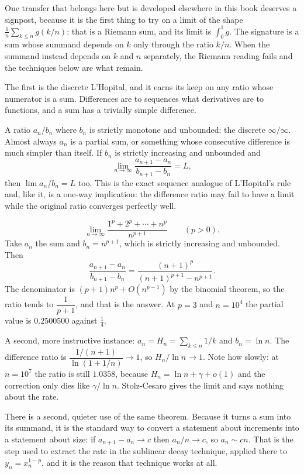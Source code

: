 One transfer that belongs here but is developed elsewhere in this book deserves a signpost, because it is the first thing to try on a limit of the shape $\tfrac1n\sum_{k\le n}g(k/n)$: that is a Riemann sum, and its limit is $\int_0^1g$. The signature is a sum whose summand depends on $k$ only through the ratio $k/n$. When the summand instead depends on $k$ and $n$ separately, the Riemann reading fails and the techniques below are what remain.

The first is the discrete L'Hopital, and it earns its keep on any ratio whose numerator is a sum. Differences are to sequences what derivatives are to functions, and a sum has a trivially simple difference.

\cue A ratio $a_n/b_n$ where $b_n$ is strictly monotone and unbounded: the discrete $\infty/\infty$. Almost always $a_n$ is a partial sum, or something whose consecutive difference is much simpler than itself.
\method If $b_n$ is strictly increasing and unbounded and
\[\lim_{n\to\infty}\frac{a_{n+1}-a_n}{b_{n+1}-b_n}=L,\]
then $\lim a_n/b_n=L$ too. This is the exact sequence analogue of L'Hopital's rule and, like it, is a one-way implication: the difference ratio may fail to have a limit while the original ratio converges perfectly well.

\begin{worked}
\[\lim_{n\to\infty}\frac{1^p+2^p+\cdots+n^p}{n^{p+1}}\qquad(p>0).\]
Take $a_n$ the sum and $b_n=n^{p+1}$, which is strictly increasing and unbounded. Then
\[\frac{a_{n+1}-a_n}{b_{n+1}-b_n}=\frac{(n+1)^p}{(n+1)^{p+1}-n^{p+1}}.\]
The denominator is $(p+1)n^p+O(n^{p-1})$ by the binomial theorem, so the ratio tends to $\dfrac{1}{p+1}$, and that is the answer. At $p=3$ and $n=10^4$ the partial value is $0.2500500$ against $\tfrac14$.

A second, more instructive instance: $a_n=H_n=\sum_{k\le n}1/k$ and $b_n=\ln n$. The difference ratio is $\dfrac{1/(n+1)}{\ln(1+1/n)}\to1$, so $H_n/\ln n\to1$. Note how slowly: at $n=10^7$ the ratio is still $1.0358$, because $H_n=\ln n+\gamma+o(1)$ and the correction only dies like $\gamma/\ln n$. Stolz-Cesaro gives the limit and says nothing about the rate.
\end{worked}

There is a second, quieter use of the same theorem. Because it turns a sum into its summand, it is the standard way to convert a statement about increments into a statement about size: if $a_{n+1}-a_n\to c$ then $a_n/n\to c$, so $a_n\sim cn$. That is the step used to extract the rate in the sublinear decay technique, applied there to $y_n=x_n^{1-p}$, and it is the reason that technique works at all.

